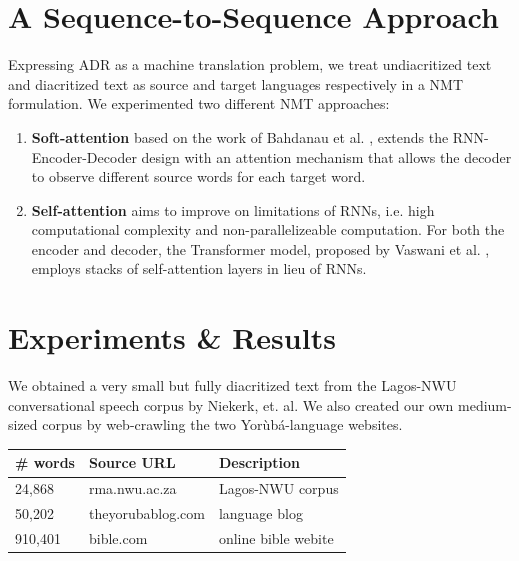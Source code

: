 \documentclass[a0,landscape]{a0poster}
\begin{document}
\begin{multicols}{4}

\section*{A Sequence-to-Sequence Approach}

Expressing ADR as a machine translation problem, we treat undiacritized text and diacritized text as source and target languages respectively in a NMT formulation. We experimented two different NMT approaches:

\begin{enumerate}
\item \textbf{Soft-attention} based on the work of Bahdanau et al. \cite{bahdanau2014neural}, extends the RNN-Encoder-Decoder design with an attention mechanism that allows the decoder to observe different source words for each target word.
\item \textbf{Self-attention} aims to improve on limitations of RNNs, i.e. high computational complexity and non-parallelizeable computation. For both the encoder and decoder, the Transformer model, proposed by Vaswani et al. \cite{vaswani2017attention}, employs stacks of self-attention layers in lieu of RNNs.
\end{enumerate}


\section*{Experiments \& Results}

We obtained a very small but fully diacritized text from the Lagos-NWU conversational speech corpus by Niekerk, et. al. We also created our own medium-sized corpus by web-crawling the two Yor{\`u}b{\'a}-language websites.

\begin{center}
  \begin{tabular}{lll}
    \toprule
    \textbf{\# words} & \textbf{Source URL}  & \textbf{Description} \\
    \midrule
    24,868 & rma.nwu.ac.za  & Lagos-NWU corpus \\  
    50,202 & theyorubablog.com & language blog\\  
    910,401 & bible.com & online bible webite \\
    \bottomrule
  \end{tabular}
\end{center}


\end{multicols}
\end{document}
